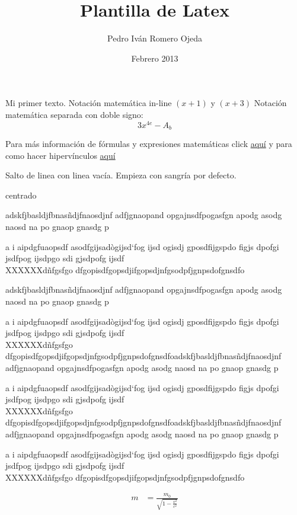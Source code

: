 \documentclass[12pt]{article}
\title{Plantilla de Latex}
\author{Pedro Iván Romero Ojeda}
\date{Febrero 2013}
\begin{document}
\maketitle
Mi primer texto. Notación matemática in-line $(x+1)$ y $(x+3)$ Notación matemática separada con doble signo: $$3x^{4e} - A_b$$

Para más información de fórmulas y expresiones matemáticas click \href{http://en.wikibooks.org/wiki/LaTeX/Mathematics}{aquí} y para como hacer hipervínculos \href{http://en.wikibooks.org/wiki/LaTeX/Hyperlinks}{aquí}

Salto de linea con linea vacía. Empieza con sangría por defecto.
\begin{center}
centrado %
\end{center}


adskfjbasldjfbnasñdjfnaosdjnf adfjgnaopand opgajnsdfpogasfgn apodg asodg naosd na po gnaop gnasdg p

a i aipdgfuaopsdf asodfgijsadògijsd`fog ijsd ogisdj gposdfijgspdo figjs dpofgi jsdfpog ijsdpgo sdi gjsdpofg ijsdf\\
XXXXXXdñfgsfgo dfgopisdfgopsdjifgopsdjnfgsodpfjgnpsdofgnsdfo

adskfjbasldjfbnasñdjfnaosdjnf adfjgnaopand opgajnsdfpogasfgn apodg asodg naosd na po gnaop gnasdg p

a i aipdgfuaopsdf asodfgijsadògijsd`fog ijsd ogisdj gposdfijgspdo figjs dpofgi jsdfpog ijsdpgo sdi gjsdpofg ijsdf\\
XXXXXXdñfgsfgo dfgopisdfgopsdjifgopsdjnfgsodpfjgnpsdofgnsdfoadskfjbasldjfbnasñdjfnaosdjnf adfjgnaopand opgajnsdfpogasfgn apodg asodg naosd na po gnaop gnasdg p

a i aipdgfuaopsdf asodfgijsadògijsd`fog ijsd ogisdj gposdfijgspdo figjs dpofgi jsdfpog ijsdpgo sdi gjsdpofg ijsdf\\
XXXXXXdñfgsfgo dfgopisdfgopsdjifgopsdjnfgsodpfjgnpsdofgnsdfoadskfjbasldjfbnasñdjfnaosdjnf adfjgnaopand opgajnsdfpogasfgn apodg asodg naosd na po gnaop gnasdg p

a i aipdgfuaopsdf asodfgijsadògijsd`fog ijsd ogisdj gposdfijgspdo figjs dpofgi jsdfpog ijsdpgo sdi gjsdpofg ijsdf\\
XXXXXXdñfgsfgo dfgopisdfgopsdjifgopsdjnfgsodpfjgnpsdofgnsdfo

\begin{align}
m &= \frac{m_0}{\sqrt{1-\frac{v^2}{c^2}}}
\end{align}
\end{document}
